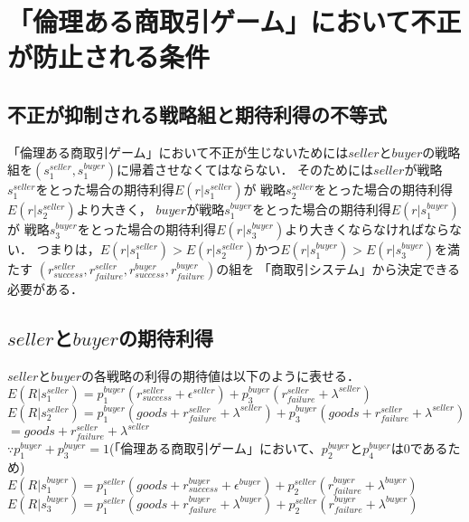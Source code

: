 \section{「倫理ある商取引ゲーム」において不正が防止される条件}
\subsection{不正が抑制される戦略組と期待利得の不等式}
「倫理ある商取引ゲーム」において不正が生じないためには$seller$と$buyer$の戦略組を$(s^{seller}_1, s^{buyer}_1)$に帰着させなくてはならない．
そのためには$seller$が戦略$s^{seller}_1$をとった場合の期待利得$E(r|s^{seller}_1)$が
戦略$s^{seller}_2$をとった場合の期待利得$E(r|s^{seller}_2)$より大きく，
$buyer$が戦略$s^{buyer}_1$をとった場合の期待利得$E(r|s^{buyer}_1)$が
戦略$s^{buyer}_3$をとった場合の期待利得$E(r|s^{buyer}_3)$より大きくならなければならない．
つまりは，$E(r|s^{seller}_1) > E(r|s^{seller}_2)$かつ$E(r|s^{buyer}_1) > E(r|s^{buyer}_3)$を満たす
$(r^{seller}_{success}, r^{seller}_{failure}, r^{buyer}_{success}, r^{buyer}_{failure})$の組を
「商取引システム」から決定できる必要がある．

\subsection{$ seller $と$ buyer $の期待利得}

$ seller $と$ buyer $の各戦略の利得の期待値は以下のように表せる．\\


$ E(R|s^{seller}_1) = p^{buyer}_1 (r^{seller}_{success} + \epsilon^{seller}) + p^{buyer}_3 (r^{seller}_{failure} + \lambda^{seller}) $ \\

$ E(R|s^{seller}_2) = p^{buyer}_1 (goods + r^{seller}_{failure} + \lambda^{seller}) + p^{buyer}_3 (goods + r^{seller}_{failure} + \lambda^{seller}) $ \\

$ = goods + r^{seller}_{failure} + \lambda^{seller} $ \\

$ \because p^{buyer}_1 + p^{buyer}_3 = 1 $(「倫理ある商取引ゲーム」において、$ p^{buyer}_2 $と$ p^{buyer}_4 $は0であるため) \\

$ E(R|s^{buyer}_1) = p^{seller}_1 (goods + r^{buyer}_{success} + \epsilon^{buyer}) + p^{seller}_2 (r^{buyer}_{failure} + \lambda^{buyer}) $ \\

$ E(R|s^{buyer}_3) = p^{seller}_1(goods+r^{buyer}_{failure} + \lambda^{buyer}) + p^{seller}_2 (r^{buyer}_{failure} + \lambda^{buyer}) $ \\

